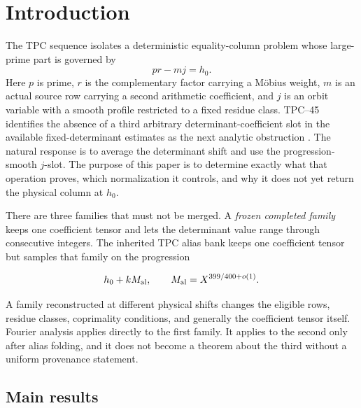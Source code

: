\section{Introduction}
\label{sec:tpc46-introduction}

The TPC sequence isolates a deterministic equality-column problem whose
large-prime part is governed by
\begin{equation}
 pr-mj=h_0.
 \label{eq:tpc46-intro-determinant}
\end{equation}
Here \(p\) is prime, \(r\) is the complementary factor carrying a
M\"obius weight, \(m\) is an actual source row carrying a second
arithmetic coefficient, and \(j\) is an orbit variable with a smooth
profile restricted to a fixed residue class.  TPC--45 identifies the
absence of a third arbitrary
determinant-coefficient slot in the available fixed-determinant
estimates as the next analytic obstruction \citep{WangTPC45}.  The
natural response is to average the determinant shift and use the
progression-smooth \(j\)-slot.  The purpose of this paper is to
determine exactly
what that operation proves, which normalization it controls, and why
it does not yet return the physical column at \(h_0\).

There are three families that must not be merged.  A \emph{frozen
completed family} keeps one coefficient tensor and lets the
determinant value range through consecutive integers.  The inherited
TPC alias bank keeps one coefficient tensor but samples that family on
the progression

\[
 h_0+kM_{\rm al},
 \qquad
 M_{\rm al}=X^{399/400+o(1)}.
\]

A family reconstructed at different physical shifts changes the
eligible rows, residue classes, coprimality conditions, and generally
the coefficient tensor itself.  Fourier analysis applies directly to
the first family.  It applies to the second only after alias folding,
and it does not become a theorem about the third without a uniform
provenance statement.

\subsection{Main results}

